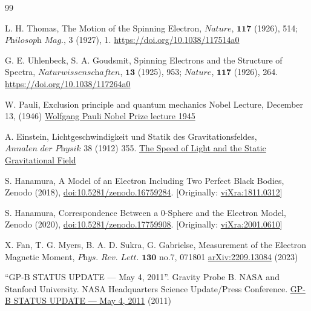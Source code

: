 \documentclass[%
 reprint,
 amsmath,amssymb,
 aps,
]{revtex4-1}
\numberwithin{equation}{section}%
\begin{document}
\begin{thebibliography}{99}

     L. H. Thomas, The Motion of the Spinning Electron, $\textit{Nature}$, $\textbf{117}$ (1926), 514; $\textit{Philosoph Mag.,}$ 3 (1927), 1. \href{https://www.nature.com/articles/117514a0}{https://doi.org/10.1038/117514a0}
    
     G. E. Uhlenbeck, S. A. Goudsmit, Spinning Electrons and the Structure of Spectra, $\textit{Naturwissenschaften}$, $\textbf{13}$ (1925), 953; $\textit{Nature}$, $\textbf{117}$ (1926), 264. \href{http://www.ffn.ub.es/luisnavarro/nuevo_maletin/Uhlenbeck_Goudsmit_1927.pdf}{https://doi.org/10.1038/117264a0}

     W. Pauli, Exclusion principle and quantum mechanics Nobel Lecture, December 13, (1946) \href{https://www.nobelprize.org/uploads/2018/06/pauli-lecture.pdf}{Wolfgang Pauli Nobel Prize lecture 1945}

     A. Einstein, Lichtgeschwindigkeit und Statik des Gravitationsfeldes, $\textit{Annalen der Physik}$ 38 (1912) 355. \href{http://myweb.rz.uni-augsburg.de/~eckern/adp/history/einstein-papers/1912_38_355-369.pdf}{The Speed of Light and the Static Gravitational Field}

     S. Hanamura, A Model of an Electron Including Two Perfect Black Bodies, Zenodo (2018), \href{https://doi.org/10.5281/zenodo.16759284}{doi:10.5281/zenodo.16759284}. [Originally: \href{http://vixra.org/abs/1811.0312}{viXra:1811.0312}]

     S. Hanamura, Correspondence Between a 0-Sphere and the Electron Model, Zenodo (2020), \href{https://doi.org/10.5281/zenodo.17759908}{doi:10.5281/zenodo.17759908}. [Originally: \href{https://vixra.org/abs/2001.0610}{viXra:2001.0610}]

     X. Fan, T. G. Myers, B. A. D. Sukra, G. Gabrielse, Measurement of the Electron Magnetic Moment, $\textit{Phys. Rev. Lett.}$ $\textbf{130}$ no.7, 071801 \href{https://arxiv.org/abs/2209.13084}{arXiv:2209.13084} (2023)


     ``GP-B STATUS UPDATE — May 4, 2011''. Gravity Probe B. NASA and Stanford University. NASA Headquarters Science Update/Press Conference. \href{http://einstein.stanford.edu/highlights/status1.html}{GP-B STATUS UPDATE — May 4, 2011} (2011)


\end{thebibliography}
\end{document}
